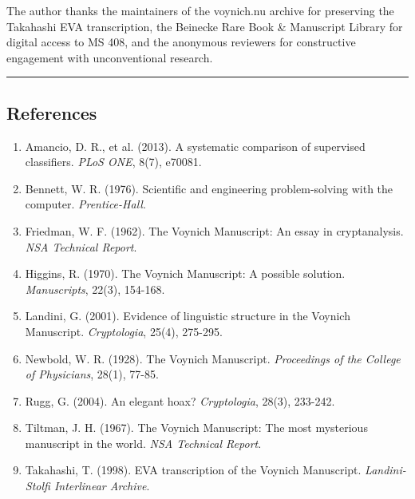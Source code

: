 \documentclass[12pt,a4paper]{article}
\begin{document}
The author thanks the maintainers of the voynich.nu archive for preserving the Takahashi EVA transcription, the Beinecke Rare Book \& Manuscript Library for digital access to MS 408, and the anonymous reviewers for constructive engagement with unconventional research.

\begin{center}
\rule{0.5\textwidth}{0.4pt}
\end{center}

\subsection{References}

\begin{enumerate}
    \item Amancio, D. R., et al. (2013). A systematic comparison of supervised classifiers. \emph{PLoS ONE}, 8(7), e70081.
    \item Bennett, W. R. (1976). Scientific and engineering problem-solving with the computer. \emph{Prentice-Hall}.
    \item Friedman, W. F. (1962). The Voynich Manuscript: An essay in cryptanalysis. \emph{NSA Technical Report}.
    \item Higgins, R. (1970). The Voynich Manuscript: A possible solution. \emph{Manuscripts}, 22(3), 154-168.
    \item Landini, G. (2001). Evidence of linguistic structure in the Voynich Manuscript. \emph{Cryptologia}, 25(4), 275-295.
    \item Newbold, W. R. (1928). The Voynich Manuscript. \emph{Proceedings of the College of Physicians}, 28(1), 77-85.
    \item Rugg, G. (2004). An elegant hoax? \emph{Cryptologia}, 28(3), 233-242.
    \item Tiltman, J. H. (1967). The Voynich Manuscript: The most mysterious manuscript in the world. \emph{NSA Technical Report}.
    \item Takahashi, T. (1998). EVA transcription of the Voynich Manuscript. \emph{Landini-Stolfi Interlinear Archive}.
\end{enumerate}
\end{document}
